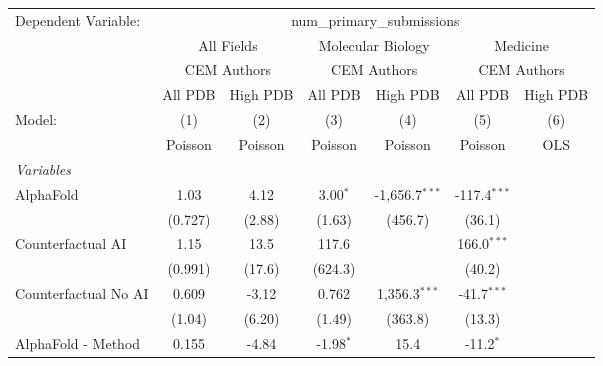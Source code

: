 \begingroup
\centering
\begin{tabular}{lcccccc}
   \tabularnewline \midrule \midrule
   Dependent Variable: & \multicolumn{6}{c}{num\_primary\_submissions}\\
 & \multicolumn{2}{c}{All Fields} & \multicolumn{2}{c}{Molecular Biology} & \multicolumn{2}{c}{Medicine} \\
\cmidrule(lr){2-3} \cmidrule(lr){4-5} \cmidrule(lr){6-7}
 & \multicolumn{2}{c}{CEM Authors} & \multicolumn{2}{c}{CEM Authors} & \multicolumn{2}{c}{CEM Authors} \\
\cmidrule(lr){2-3} \cmidrule(lr){4-5} \cmidrule(lr){6-7}
 & \multicolumn{1}{c}{All PDB} & \multicolumn{1}{c}{High PDB} & \multicolumn{1}{c}{All PDB} & \multicolumn{1}{c}{High PDB} & \multicolumn{1}{c}{All PDB} & \multicolumn{1}{c}{High PDB} \\
\cmidrule(lr){2-2} \cmidrule(lr){3-3} \cmidrule(lr){4-4} \cmidrule(lr){5-5} \cmidrule(lr){6-6} \cmidrule(lr){7-7}
   Model:                                                     & (1)          & (2)       & (3)         & (4)              & (5)            & (6)\\  
                                                              &  Poisson     & Poisson   & Poisson     & Poisson          & Poisson        & OLS\\  
   \midrule
   \emph{Variables}\\
   AlphaFold                                                  & 1.03         & 4.12      & 3.00$^{*}$  & -1,656.7$^{***}$ & -117.4$^{***}$ &   \\   
                                                              & (0.727)      & (2.88)    & (1.63)      & (456.7)          & (36.1)         &   \\   
   Counterfactual AI                                          & 1.15         & 13.5      & 117.6       &                  & 166.0$^{***}$  &   \\   
                                                              & (0.991)      & (17.6)    & (624.3)     &                  & (40.2)         &   \\   
   Counterfactual No AI                                       & 0.609        & -3.12     & 0.762       & 1,356.3$^{***}$  & -41.7$^{***}$  &   \\   
                                                              & (1.04)       & (6.20)    & (1.49)      & (363.8)          & (13.3)         &   \\   
   AlphaFold - Method                                         & 0.155        & -4.84     & -1.98$^{*}$ & 15.4             & -11.2$^{*}$    &   \\   

\end{tabular}
